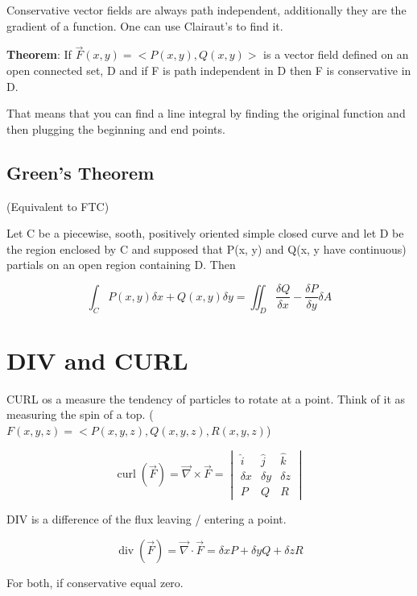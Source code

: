 \documentclass{article}
\newcommand{\CURL}{\operatorname{curl}}
\newcommand{\DIV}{\operatorname{div}}
\begin{document}
Conservative vector fields are always path independent, additionally they are the gradient of a function. One can use Clairaut's to find it. 

\textbf{Theorem}: If $\vec{F}(x, y) = <P(x, y), Q(x, y)>$ is a vector field defined on an open connected set, D and if F is path independent in D then F is conservative in D.

That means that you can find a line integral by finding the original function and then plugging the beginning and end points. 

\subsection{Green's Theorem}

(Equivalent to FTC)

Let C be a piecewise, sooth, positively oriented simple closed curve and let D be the region enclosed by C and supposed that P(x, y) and Q(x, y have continuous) partials on an open region containing D. Then 

$$\int_C P(x, y) \delta x + Q(x, y) \delta y = \iint_D \frac{\delta Q}{\delta x} - \frac{\delta P}{\delta y} \delta A$$


\section{DIV and CURL}

CURL os a measure the tendency of particles to rotate at a point. Think of it as measuring the spin of a top. ($F(x, y, z) = <P(x, y, z), Q(x,y,z), R(x,y,z)$)

\[
\CURL(\vec{F}) = \vec{\nabla} \times \vec{F} = \begin{vmatrix}
    \hat{i} & \hat{j} & \hat{k} \\
    \delta x & \delta y & \delta z \\
    P & Q & R
\end{vmatrix}
\]

DIV is a difference of the flux leaving / entering a point. 

\[
\DIV(\vec{F}) =  \vec{\nabla} \cdot \vec{F} = \delta x P + \delta y Q + \delta z R
\]



For both, if conservative equal zero.
\end{document}
